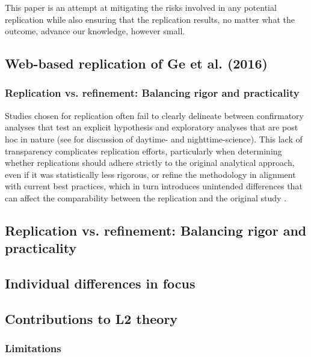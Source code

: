 This paper is an attempt at mitigating the risks involved in any potential replication while also ensuring that the replication results, no matter what the outcome, advance our knowledge, however small. 

\subsection{Web-based replication of Ge et al. (2016)}

\subsubsection{Replication vs. refinement: Balancing rigor and practicality}


Studies chosen for replication often fail to clearly delineate between confirmatory analyses that test an explicit hypothesis and exploratory analyses that are post hoc in nature (see \cite{Yanai2020} for discussion of daytime- and nighttime-science). This lack of transparency complicates replication efforts, particularly when determining whether replications should adhere strictly to the original analytical approach, even if it was statistically less rigorous, or refine the methodology in alignment with current best practices, which in turn introduces unintended differences that can affect the comparability between the replication and the original study \cite{mcmanus2022replication}.


\subsection{Replication vs. refinement: Balancing rigor and practicality}


\subsection{Individual differences in focus}

\subsection{Contributions to L2 theory}


\subsubsection{Limitations}




